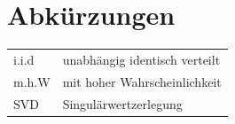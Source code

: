 \documentclass[12pt,a4paper,twoside]{article}
\begin{document}

	\newpage
\section*{Abkürzungen}
	\begin{tabular}{ll}
		i.i.d & unabhängig identisch verteilt \\
		m.h.W & mit hoher Wahrscheinlichkeit\\
		SVD & Singulärwertzerlegung \\
	\end{tabular}
	\newpage

\end{document}
